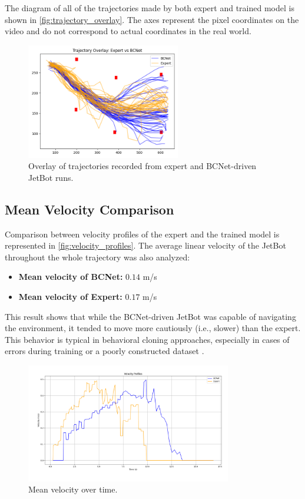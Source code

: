 The diagram of all of the trajectories made by both expert and trained model is shown in \autoref{fig:trajectory_overlay}. The axes represent the pixel coordinates on the video and do not correspond to actual coordinates in the real world.

\begin{figure}[htbp]
  \centering
  \includegraphics[width=0.6\textwidth]{Images/Evaluation/trajectory_overlay.png}
  \caption{Overlay of trajectories recorded from expert and BCNet-driven JetBot runs.}
  \label{fig:trajectory_overlay}
\end{figure}

\subsection{Mean Velocity Comparison}

Comparison between velocity profiles of the expert and the trained model is represented in \autoref{fig:velocity_profiles}. The average linear velocity of the JetBot throughout the whole trajectory was also analyzed:

\begin{itemize}
  \item \textbf{Mean velocity of BCNet:} $0.14$ m/s
  \item \textbf{Mean velocity of Expert:} $0.17$ m/s
\end{itemize}

This result shows that while the BCNet-driven JetBot was capable of navigating the environment, it tended to move more cautiously (i.e., slower) than the expert. This behavior is typical in behavioral cloning approaches, especially in cases of errors during training or a poorly constructed dataset \autocite{bühler2020drivingghostsbehavioralcloning}.

\begin{figure}[H]
  \centering
  \includegraphics[width=0.8\textwidth]{Images/Evaluation/velocity_profiles.png}
  \caption{Mean velocity over time.}
  \label{fig:velocity_profiles}
\end{figure}

